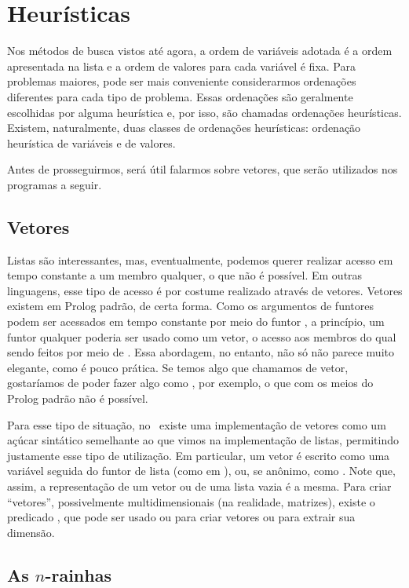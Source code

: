 \documentclass{article}
\begin{document}
\section{Heurísticas}

Nos métodos de busca vistos até agora, a ordem de variáveis adotada é
a ordem apresentada na lista e a ordem de valores para cada variável é
fixa. Para problemas maiores, pode ser mais conveniente considerarmos
ordenações diferentes para cada tipo de problema. Essas ordenações são
geralmente escolhidas por alguma heurística e, por isso, são chamadas
ordenações heurísticas. Existem, naturalmente, duas classes de
ordenações heurísticas: ordenação heurística de variáveis e de
valores.

Antes de prosseguirmos, será útil falarmos sobre vetores, que serão
utilizados nos programas a seguir.

\subsection{Vetores}

Listas são interessantes, mas, eventualmente, podemos querer realizar
acesso em tempo constante a um membro qualquer, o que não é
possível. Em outras linguagens, esse tipo de acesso é por costume
realizado através de vetores. Vetores existem em Prolog padrão, de
certa forma. Como os argumentos de funtores podem ser acessados em
tempo constante por meio do funtor , a princípio, um
funtor qualquer poderia ser usado como um vetor, o acesso aos membros
do qual sendo feitos por meio de . Essa abordagem, no
entanto, não só não parece muito elegante, como é pouco prática.  Se
temos algo que chamamos de vetor, gostaríamos de poder fazer algo como
, por exemplo, o que com os meios do Prolog
padrão não é possível.

Para esse tipo de situação, no \eclipse\ existe uma implementação de
vetores como um açúcar sintático semelhante ao que vimos na
implementação de listas, permitindo justamente esse tipo de
utilização. Em particular, um vetor é escrito como uma variável
seguida do funtor de lista (como em ), ou, se anônimo,
como . Note que, assim, a representação de um
vetor ou de uma lista vazia é a mesma. Para criar ``vetores'',
possivelmente multidimensionais (na realidade, matrizes), existe o
predicado , que pode ser usado ou para criar vetores ou
para extrair sua dimensão.

\subsection{As $n$-rainhas}
\end{document}
